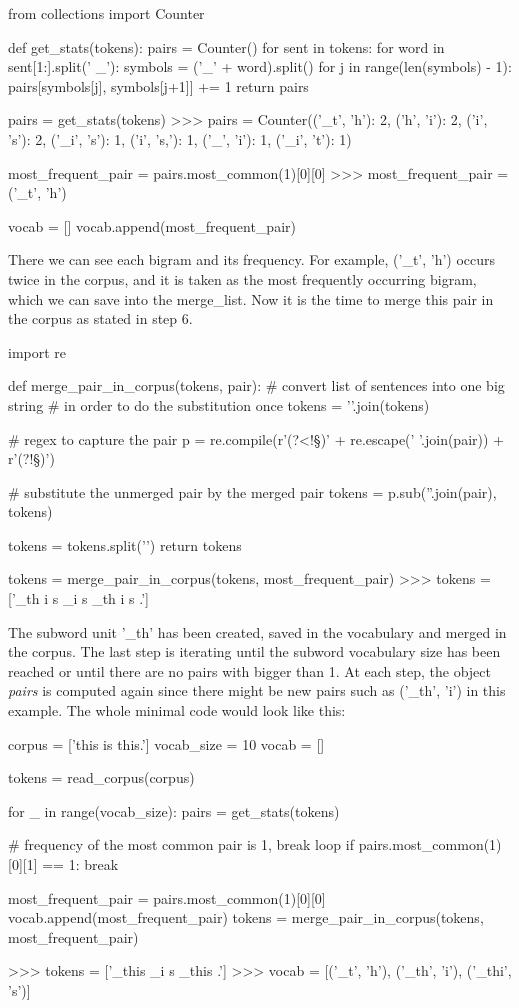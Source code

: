 \begin{python}
from collections import Counter

def get_stats(tokens):
  pairs = Counter()
  for sent in tokens:
    for word in sent[1:].split(' _'):
      symbols = ('_' + word).split()
      for j in range(len(symbols) - 1):
        pairs[symbols[j], symbols[j+1]] += 1
  return pairs

pairs = get_stats(tokens)
>>> pairs = Counter({('_t', 'h'): 2, ('h', 'i'): 2, ('i', 's'): 2, 
                    ('_i', 's'): 1, ('i', 's,'): 1, ('_', 'i'): 1, ('_i', 't'): 1})

most_frequent_pair = pairs.most_common(1)[0][0]
>>> most_frequent_pair = ('_t', 'h')

vocab = []
vocab.append(most_frequent_pair)
\end{python}

There we can see each bigram and its frequency. For example, ('\_t', 'h') occurs twice in the corpus, and it is taken as the most frequently occurring bigram, which we can save into the merge\_list. Now it is the time to merge this pair in the corpus as stated in step 6.

\begin{python}
import re

def merge_pair_in_corpus(tokens, pair):
  # convert list of sentences into one big string
  # in order to do the substitution once
  tokens = '\n'.join(tokens)

  # regex to capture the pair
  p = re.compile(r'(?<!\S)' + re.escape(' '.join(pair)) + r'(?!\S)')

  # substitute the unmerged pair by the merged pair
  tokens = p.sub(''.join(pair), tokens)

  tokens = tokens.split('\n')
  return tokens

tokens = merge_pair_in_corpus(tokens, most_frequent_pair)
>>> tokens = ['_th i s _i s _th i s .']
\end{python}

The subword unit '\_th' has been created, saved in the vocabulary and merged in the corpus. The last step is iterating until the subword vocabulary size has been reached or until there are no pairs with bigger than 1. At each step, the object \emph{pairs} is computed again since there might be new pairs such as ('\_th', 'i') in this example. The whole minimal code would look like this:

\begin{python}
corpus = ['this is this.']
vocab_size = 10
vocab = []

tokens = read_corpus(corpus)

for _ in range(vocab_size):
  pairs = get_stats(tokens)

  # frequency of the most common pair is 1, break loop
  if pairs.most_common(1)[0][1] == 1:
      break

  most_frequent_pair = pairs.most_common(1)[0][0]
  vocab.append(most_frequent_pair)
  tokens = merge_pair_in_corpus(tokens, most_frequent_pair)

>>> tokens = ['_this _i s _this .']
>>> vocab = [('_t', 'h'), ('_th', 'i'), ('_thi', 's')]
\end{python}


